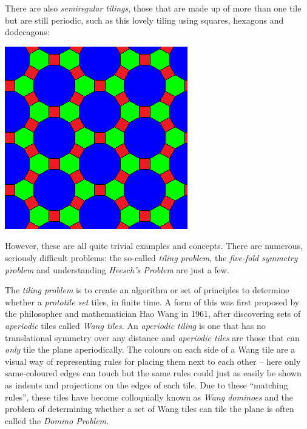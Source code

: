 \documentclass[1opt,a4paper]{article}
\begin{document}
\begin{multicols}{2}
There are also \emph{semiregular tilings}, those that are made up of
more than one tile but are still periodic, such as this lovely tiling
using squares, hexagons and dodecagons:

\includegraphics[width=\linewidth]{image_6.png}

However, these are all quite trivial examples and concepts. There are
numerous, seriously difficult problems: the so-called \emph{tiling
	problem, }the \emph{five-fold symmetry problem }and understanding
\emph{Heesch's Problem }are just a few.

The \emph{tiling problem} is to create an algorithm or set of principles
to determine whether a \emph{prototile set} tiles, in finite time. A
form of this was first proposed by the philosopher and mathematician Hao
Wang in 1961, after discovering sets of \emph{aperiodic} tiles called
\emph{Wang tiles. }An \emph{aperiodic tiling }is one that has no translational symmetry over any distance and \emph{aperiodic
	tiles }are those that can \emph{only }tile the plane aperiodically. The
colours on each side of a Wang tile are a visual way of representing
rules for placing them next to each other -- here only same-coloured
edges can touch but the same rules could just as easily be shown as
indents and projections on the edges of each tile. Due to these
``matching rules'', these tiles have become colloquially known as
\emph{Wang dominoes }and the problem of determining whether a set of
Wang tiles can tile the plane is often called the \emph{Domino Problem.}


\end{multicols}
\end{document}

